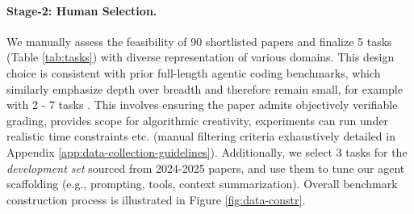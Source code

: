 \documentclass[11pt]{article}
\let\cite\citep
\theoremstyle{plain}
\theoremstyle{definition}
\theoremstyle{remark}
\begin{document}


\paragraph{Stage-2: Human Selection.} We manually assess the feasibility of 90 shortlisted papers and finalize 5 tasks (Table \ref{tab:tasks}) with diverse representation of various domains. This design choice is consistent with prior full-length agentic coding benchmarks, which similarly emphasize depth over breadth and therefore remain small, for example with 2 - 7 tasks \cite{wijk2025rebench, zhang2025mlrcbenchlanguageagentssolve, si2026executiongroundedautomatedairesearch}.
This involves ensuring the paper admits objectively verifiable grading, provides scope for algorithmic creativity, experiments can run under realistic time constraints etc. (manual filtering criteria exhaustively detailed in Appendix \ref{app:data-collection-guidelines}). 
Additionally, we select 3 tasks for the \emph{development set} sourced from 2024-2025 papers, and use them to tune our agent scaffolding (e.g., prompting, tools, context summarization). 
Overall benchmark construction process is illustrated in Figure \ref{fig:data-constr}.
\end{document}
